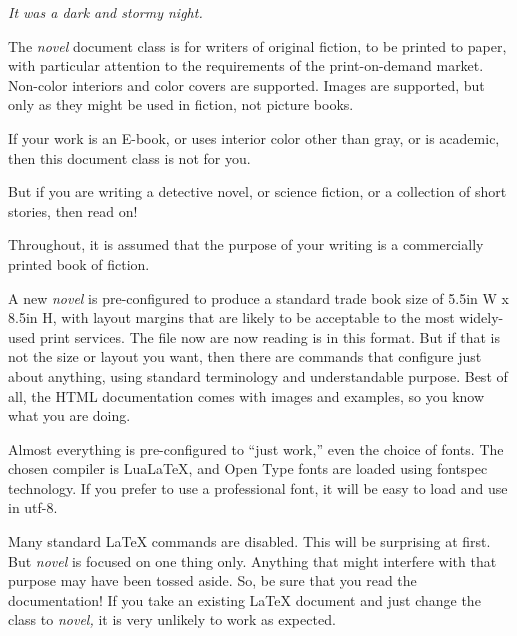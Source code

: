 \documentclass{novel} %
\begin{document}
\begin{ChapterStart}[14]
\vspace{2\nbs} %
\null
{}
\vspace{2.5\nbs}
\null
{\centering\textit{It was a dark and stormy night.}\par}
\end{ChapterStart}

The \emph{novel} document class is for writers of original fiction, to be printed to paper, with particular attention to the requirements of the print-on-demand market. Non-color interiors and color covers are supported. Images are supported, but only as they might be used in fiction, not picture books.

If your work is an E-book, or uses interior color other than gray, or is academic, then this document class is not for you. 

But if you are writing a detective novel, or science fiction, or a collection of short stories, then read on!


Throughout, it is assumed that the purpose of your writing is a commercially printed book of fiction.

A new \emph{novel} is pre-configured to produce a standard trade book size of 5.5in W x 8.5in H, with layout margins that are likely to be acceptable to the most widely-used print services. The file now are now reading is in this format. But if that is not the size or layout you want, then there are commands that configure just about anything, using standard terminology and understandable purpose. Best of all, the HTML documentation comes with images and examples, so you know what you are doing.

Almost everything is pre-configured to “just work,” even the choice of fonts. The chosen compiler is LuaLaTeX, and Open Type fonts are loaded using fontspec technology. If you prefer to use a professional font, it will be easy to load and use in utf-8.

Many standard LaTeX commands are disabled. This will be surprising at first. But \emph{novel} is focused on one thing only. Anything that might interfere with that purpose may have been tossed aside. So, be sure that you read the documentation! If you take an existing LaTeX document and just change the class to \emph{novel,} it is very unlikely to work as expected.
\end{document}
